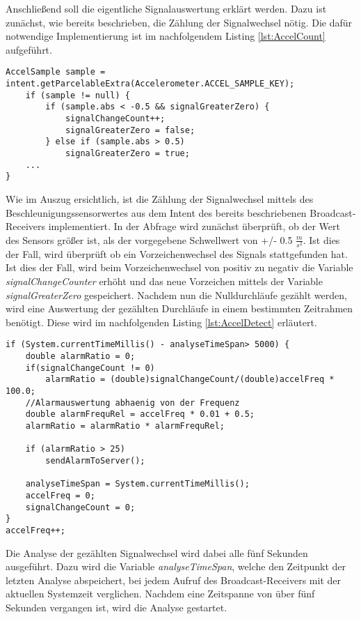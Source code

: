 Anschließend soll die eigentliche Signalauswertung erklärt werden. Dazu ist zunächst, wie bereits beschrieben, die Zählung der Signalwechsel nötig. Die dafür notwendige Implementierung ist im nachfolgendem Listing \ref{lst:AccelCount} aufgeführt.
\begin{lstlisting}[caption={Implementierung der Erdbebenerkennung},label=lst:AccelCount]
AccelSample sample = intent.getParcelableExtra(Accelerometer.ACCEL_SAMPLE_KEY); 
	if (sample != null) {
		if (sample.abs < -0.5 && signalGreaterZero) {
			signalChangeCount++;
			signalGreaterZero = false; 
		} else if (sample.abs > 0.5)
			signalGreaterZero = true;
	...
}
\end{lstlisting}
Wie im Auszug ersichtlich, ist die Zählung der Signalwechsel mittels des Beschleunigungssensorwertes aus dem Intent des bereits beschriebenen Broadcast-Receivers implementiert. In der Abfrage wird zunächst überprüft, ob der Wert des Sensors größer ist, als der vorgegebene Schwellwert von +/- 0.5 $\frac{m}{s^2}$. Ist dies der Fall, wird überprüft ob ein Vorzeichenwechsel des Signals stattgefunden hat. Ist dies der Fall, wird beim Vorzeichenwechsel von positiv zu negativ die Variable \textit{signalChangeCounter} erhöht und das neue Vorzeichen mittels der Variable \textit{signalGreaterZero} gespeichert. Nachdem nun die Nulldurchläufe gezählt werden, wird eine Auswertung der gezählten Durchläufe in einem bestimmten Zeitrahmen benötigt. Diese wird im nachfolgenden Listing \ref{lst:AccelDetect} erläutert.
\begin{lstlisting}[caption={Analyse der gezählten Nulldurchläufe},label=lst:AccelDetect]
if (System.currentTimeMillis() - analyseTimeSpan> 5000) {
	double alarmRatio = 0;
	if(signalChangeCount != 0)
		alarmRatio = (double)signalChangeCount/(double)accelFreq * 100.0;
	//Alarmauswertung abhaenig von der Frequenz
	double alarmFrequRel = accelFreq * 0.01 + 0.5;
	alarmRatio = alarmRatio * alarmFrequRel;
							
	if (alarmRatio > 25) 
		sendAlarmToServer();
							
	analyseTimeSpan = System.currentTimeMillis();
	accelFreq = 0;
	signalChangeCount = 0;
}
accelFreq++;
\end{lstlisting}
Die Analyse der gezählten Signalwechsel wird dabei alle fünf Sekunden ausgeführt. Dazu wird die Variable \textit{analyseTimeSpan}, welche den Zeitpunkt der letzten Analyse abspeichert, bei jedem Aufruf des Broadcast-Receivers mit der aktuellen Systemzeit verglichen. Nachdem eine Zeitspanne von über fünf Sekunden vergangen ist, wird die Analyse gestartet.\\
